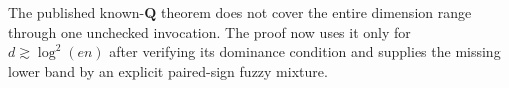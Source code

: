 The published known-\(\mathbf Q\) theorem does not cover the entire dimension range through one unchecked invocation.  The proof now uses it only for \(d\gtrsim\log^2(en)\) after verifying its dominance condition and supplies the missing lower band by an explicit paired-sign fuzzy mixture.